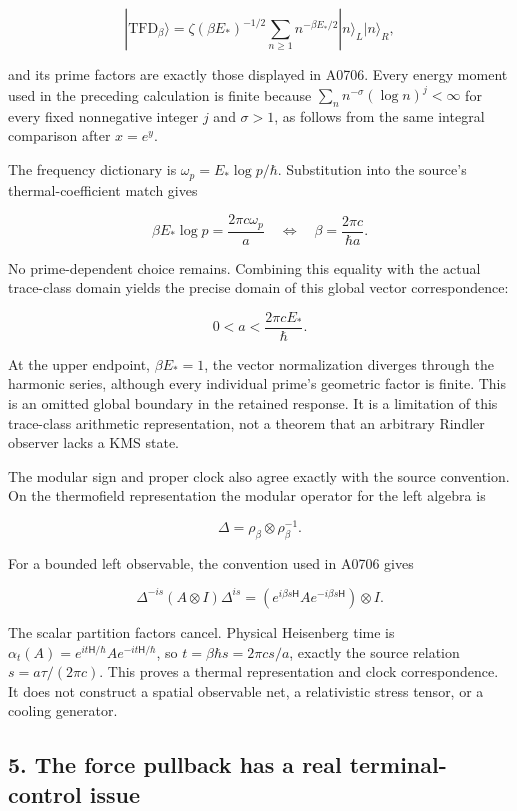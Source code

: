 \[
|\mathrm{TFD}_\beta\rangle
=\zeta(\beta E_*)^{-1/2}\sum_{n\ge1}n^{-\beta E_*/2}|n\rangle_L|n\rangle_R,
\]

and its prime factors are exactly those displayed in A0706. Every energy
moment used in the preceding calculation is finite because
\(\sum_n n^{-\sigma}(\log n)^j<\infty\) for every fixed nonnegative
integer \(j\) and \(\sigma>1\), as follows from the same integral
comparison after \(x=e^y\).

The frequency dictionary is \(\omega_p=E_*\log p/\hbar\). Substitution
into the source's thermal-coefficient match gives

\[
\beta E_*\log p=\frac{2\pi c\omega_p}{a}
\quad\Longleftrightarrow\quad
\beta=\frac{2\pi c}{\hbar a}.
\]

No prime-dependent choice remains. Combining this equality with the
actual trace-class domain yields the precise domain of this global
vector correspondence:

\[
0<a<\frac{2\pi cE_*}{\hbar}.
\]

At the upper endpoint, \(\beta E_*=1\), the vector normalization
diverges through the harmonic series, although every individual prime's
geometric factor is finite. This is an omitted global boundary in the
retained response. It is a limitation of this trace-class arithmetic
representation, not a theorem that an arbitrary Rindler observer lacks a
KMS state.

The modular sign and proper clock also agree exactly with the source
convention. On the thermofield representation the modular operator for
the left algebra is

\[
\Delta=\rho_\beta\otimes\rho_\beta^{-1}.
\]

For a bounded left observable, the convention used in A0706 gives

\[
\Delta^{-is}(A\otimes I)\Delta^{is}
=(e^{i\beta s\mathsf H}Ae^{-i\beta s\mathsf H})\otimes I.
\]

The scalar partition factors cancel. Physical Heisenberg time is
\(\alpha_t(A)=e^{it\mathsf H/\hbar}Ae^{-it\mathsf H/\hbar}\), so
\(t=\beta\hbar s=2\pi cs/a\), exactly the source relation
\(s=a\tau/(2\pi c)\). This proves a thermal representation and clock
correspondence. It does not construct a spatial observable net, a
relativistic stress tensor, or a cooling generator.

\subsection{5. The force pullback has a real terminal-control
issue}\label{TranscriptStage:proof10:the-force-pullback-has-a-real-terminal-control-issue}


